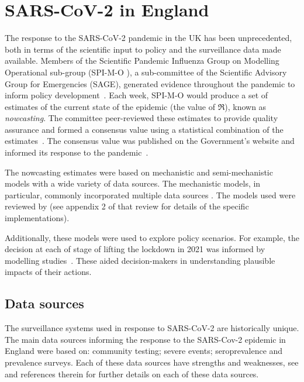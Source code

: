 \documentclass[thesis.tex]{subfiles}
\begin{document}
\section{SARS-CoV-2 in England}

The response to the SARS-CoV-2 pandemic in the UK has been unprecedented, both in terms of the scientific input to policy and the surveillance data made available. Members of the Scientific Pandemic Influenza Group on Modelling Operational sub-group (SPI-M-O ), a sub-committee of the Scientific Advisory Group for Emergencies (SAGE), generated evidence throughout the pandemic to inform policy development~\autocite{medleySPIM,govSPIMO}.
Each week, SPI-M-O would produce a set of estimates of the current state of the epidemic (\eg the value of $\Re$), known as \emph{nowcasting}.
The committee peer-reviewed these estimates to provide quality assurance and formed a consensus value using a statistical combination of the estimates~\autocite{parkCombining}.
The consensus value was published on the Government's website and informed its response to the pandemic~\autocite{govRnumber}.

The nowcasting estimates were based on mechanistic and semi-mechanistic models with a wide variety of data sources.
The mechanistic models, in  particular, commonly incorporated multiple data sources \textcite{birrellEvidence}.
The models used were reviewed by \textcite{royalSocietyRnumber} (see appendix 2 of that review for details of the specific implementations).

Additionally, these models were used to explore policy scenarios.
For example, the decision at each of stage of lifting the lockdown in 2021 was informed by modelling studies~\autocite{sageEvidence}.
These aided decision-makers in understanding plausible impacts of their actions.

\subsection{Data sources} \label{intro:sec:data-for-estimating}

The surveillance systems used in response to SARS-CoV-2 are historically unique. 
The main data sources informing the response to the SARS-Cov-2 epidemic in England were based on: community testing; severe events; seroprevalence and prevalence surveys.
Each of these data sources have strengths and weaknesses, see \textcite{royalSocietyRnumber} and references therein for further details on each of these data sources.
\end{document}
